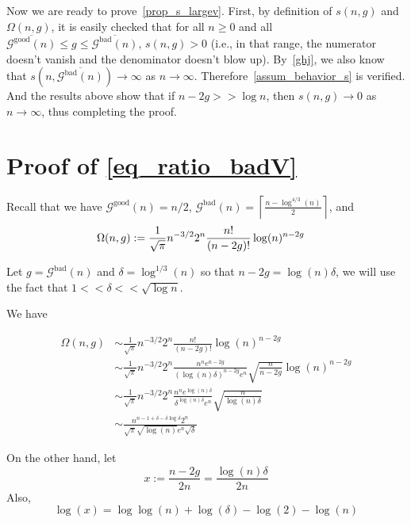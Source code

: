 \documentclass[a4paper,12pt]{article}
\theoremstyle{definition}
\newcommand{\nto}{\ensuremath{n\rightarrow\infty}}
\newcommand{\good}[1]{\mathcal{G}^{\text{good}}({#1})}
\newcommand{\goodG}{\good{n}}
\newcommand{\goodGG}{\overline{\goodG}}
\newcommand{\bad}[1]{\mathcal{G}^{\text{bad}}({#1})}
\newcommand{\badG}{\bad{n}}
\newcommand{\badGG}{\overline{\badG}}
\newcommand{\badV}{\log^{4/3}(n)}
\begin{document}
Now we are ready to prove~\cref{prop_s_largev}. First, by definition of $s(n,g)$ and $\Omega(n,g)$, it is easily checked that for all $n\geq 0$ and all $\goodGG\leq g\leq \badGG$, $s(n,g)>0$ (i.e., in that range, the numerator doesn't vanish and the denominator doesn't blow up). By~\eqref{ghj}, we also know that $s(n,\badGG)\to \infty$ as $\nto$. Therefore~\cref{assum_behavior_s} is verified. And the results above show that if $n-2g>>\log n$, then $s(n,g)\to 0$ as $\nto$, thus completing the proof.

\section{Proof of \eqref{eq_ratio_badV}}\label{sec:badV}
Recall that we have $\goodG=n/2$, $\badG=\left\lceil\frac{n-\badV}{2}\right\rceil$, and 
\begin{align}
    \Omega(n,g) &:=\frac{1}{\sqrt{\pi}} n^{-3/2} 2^n \frac{n!}{(n-2g)!}\log(n)^{n-2g}
    \notag
\end{align}

Let $g=\badG$ and $\delta=\log^{1/3}(n)$ so that $n-2g=\log(n)\delta$, we will use the fact that $1<<\delta<<\sqrt{\log n}$.

We have

\begin{align}
\Omega(n,g)&\sim \frac{1}{\sqrt{\pi}}n^{-3/2}2^{n}\frac{n!}{(n-2g)!}\log(n)^{n-2g}\\
&\sim \frac{1}{\sqrt{\pi}}n^{-3/2}2^{n}\frac{n^ne^{n-2g}}{(\log (n) \delta)^{n-2g}e^{n}}\sqrt{\frac{n}{n-2g}}\log(n)^{n-2g}\\
&\sim \frac{1}{\sqrt{\pi}}n^{-3/2}2^{n}\frac{n^ne^{\log(n)\delta}}{\delta^{\log(n)\delta}e^{n}}\sqrt{\frac{n}{\log(n) \delta}}\\
&\sim \frac{n^{n-1+\delta-\delta\log{\delta}}2^{n}}{\sqrt{\pi}\sqrt{\log(n)}e^{n}\sqrt{\delta}}\label{xxx}
\end{align}


On the other hand, let 
\begin{equation}
x:=\frac{n-2g}{2n}=\frac{\log(n)\delta}{2n}
\end{equation}
Also,
\begin{equation}
\log(x)=\log\log(n)+\log(\delta)-\log(2)-\log(n)
\end{equation}
\end{document}
